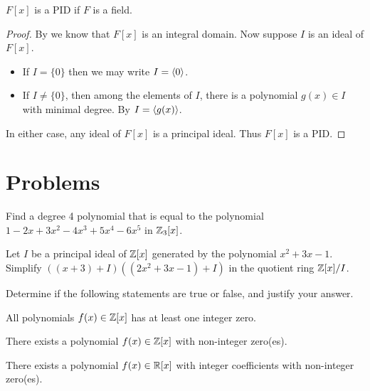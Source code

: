\begin{theorem}\label{thrm-polynomial-ring-over-field-is-a-PID}
    $F[x]$ is a PID if $F$ is a field.
\end{theorem}
\begin{proof}
    By  we know that $F[x]$ is an integral domain. Now suppose $I$ is an ideal of $F[x]$.
    \begin{itemize}
        \item If $I = \{0\}$ then we may write $I = \left\langle0\right\rangle$.
        \item If $I \neq \{0\}$, then among the elements of $I$, there is a polynomial $g(x) \in I$ with minimal degree. By  $I = \left\langle g(x)\right\rangle$.
    \end{itemize}
    In either case, any ideal of $F[x]$ is a principal ideal. Thus $F[x]$ is a PID.
\end{proof}

\newpage

\section{Problems}
\begin{problem}
    Find a degree 4 polynomial that is equal to the polynomial $1 - 2x + 3x^2 - 4x^3 + 5x^4 - 6x^5$ in $\mathbb{Z}_3[x]$.
\end{problem}

\begin{problem}
    Let $I$ be a principal ideal of $\mathbb{Z}[x]$ generated by the polynomial $x^2 + 3x - 1$. Simplify $\left((x + 3) + I\right)\left((2x^2 + 3x - 1) + I\right)$ in the quotient ring $\mathbb{Z}[x]/I$.
\end{problem}

\begin{problem}
    Determine if the following statements are true or false, and justify your answer.
    \begin{partquestions}{\alph*}
        \item All polynomials $f(x) \in \mathbb{Z}[x]$ has at least one integer zero.
        \item There exists a polynomial $f(x) \in \mathbb{Z}[x]$ with non-integer zero(es).
        \item There exists a polynomial $f(x) \in \mathbb{R}[x]$ with integer coefficients with non-integer zero(es).
    \end{partquestions}
\end{problem}

